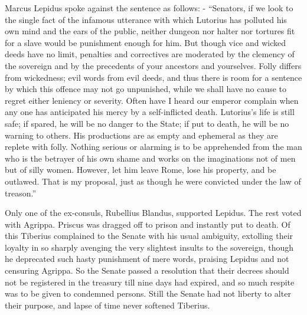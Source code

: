 
Marcus Lepidus spoke against the sentence as follows: - ``Senators, if we look to the single fact of the infamous utterance with which Lutorius has polluted his own mind and the ears of the public, neither dungeon nor halter nor tortures fit for a slave would be punishment enough for him. But though vice and wicked deeds have no limit, penalties and correctives are moderated by the clemency of the sovereign and by the precedents of your ancestors and yourselves. Folly differs from wickedness; evil words from evil deeds, and thus there is room for a sentence by which this offence may not go unpunished, while we shall have no cause to regret either leniency or severity. Often have I heard our emperor complain when any one has anticipated his mercy by a self-inflicted death. Lutorius's life is still safe; if spared, he will be no danger to the State; if put to death, he will be no warning to others. His productions are as empty and ephemeral as they are replete with folly. Nothing serious or alarming is to be apprehended from the man who is the betrayer of his own shame and works on the imaginations not of men but of silly women. However, let him leave Rome, lose his property, and be outlawed. That is my proposal, just as though he were convicted under the law of treason.''


Only one of the ex-consuls, Rubellius Blandus, supported Lepidus. The rest voted with Agrippa. Priscus was dragged off to prison and instantly put to death. Of this Tiberius complained to the Senate with his usual ambiguity, extolling their loyalty in so sharply avenging the very slightest insults to the sovereign, though he deprecated such hasty punishment of mere words, praising Lepidus and not censuring Agrippa. So the Senate passed a resolution that their decrees should not be registered in the treasury till nine days had expired, and so much respite was to be given to condemned persons. Still the Senate had not liberty to alter their purpose, and lapse of time never softened Tiberius.


